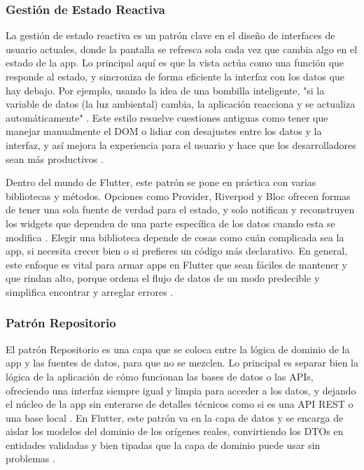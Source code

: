 \subsubsection{Gestión de Estado Reactiva}
La gestión de estado reactiva es un patrón clave en el diseño de interfaces de usuario actuales, donde la pantalla se refresca sola cada vez que cambia algo en el estado de la app. Lo principal aquí es que la vista actúa como una función que responde al estado, y sincroniza de forma eficiente la interfaz con los datos que hay debajo. Por ejemplo, usando la idea de una bombilla inteligente, "si la variable de datos (la luz ambiental) cambia, la aplicación reacciona y se actualiza automáticamente" \cite{MediumReactivity2024}. Este estilo resuelve cuestiones antiguas como tener que manejar manualmente el DOM o lidiar con desajustes entre los datos y la interfaz, y así mejora la experiencia para el usuario y hace que los desarrolladores sean más productivos \cite{DevToReactiveState}.

Dentro del mundo de Flutter, este patrón se pone en práctica con varias bibliotecas y métodos. Opciones como Provider, Riverpod y Bloc ofrecen formas de tener una sola fuente de verdad para el estado, y solo notifican y reconstruyen los widgets que dependen de una parte específica de los datos cuando esta se modifica \cite{TrioLibraries2026}. Elegir una biblioteca depende de cosas como cuán complicada sea la app, si necesita crecer bien o si prefieres un código más declarativo. En general, este enfoque es vital para armar apps en Flutter que sean fáciles de mantener y que rindan alto, porque ordena el flujo de datos de un modo predecible y simplifica encontrar y arreglar errores \cite{MediumReactivity2024}.

\subsubsection{Patrón Repositorio}

El patrón Repositorio es una capa que se coloca entre la lógica de dominio de la app y las fuentes de datos, para que no se mezclen. Lo principal es separar bien la lógica de la aplicación de cómo funcionan las bases de datos o las APIs, ofreciendo una interfaz siempre igual y limpia para acceder a los datos, y dejando el núcleo de la app sin enterarse de detalles técnicos como si es una API REST o una base local \cite{ModyoRepoPattern}. En Flutter, este patrón va en la capa de datos y se encarga de aislar los modelos del dominio de los orígenes reales, convirtiendo los DTOs en entidades validadas y bien tipadas que la capa de dominio puede usar sin problemas \cite{MediumCleanArchRepo}.

